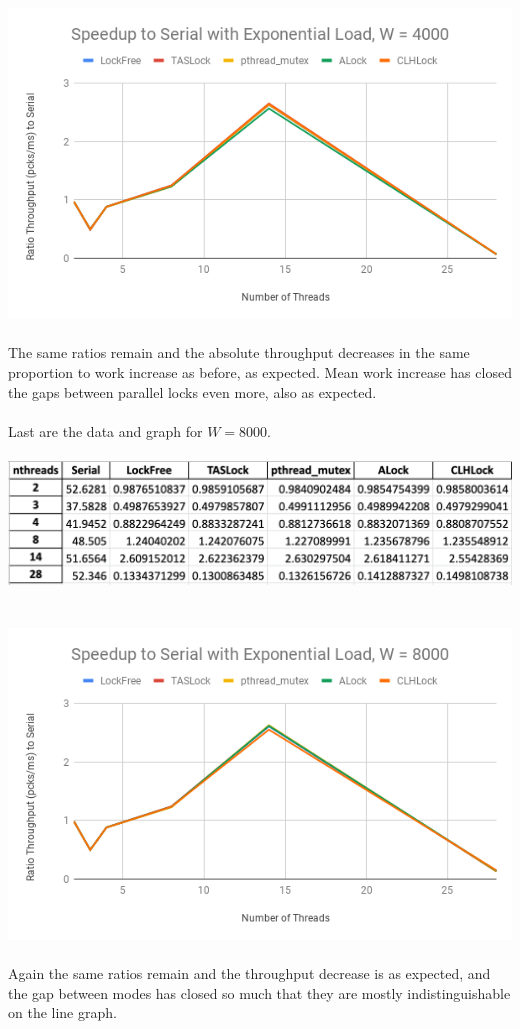 \documentclass{article}
\begin{document}
\begin{adjustwidth}{-2cm}{-2cm}
\null\\
\includegraphics[width=\linewidth]{b_exp4000Graph.png}\\ \null\\
The same ratios remain and the absolute throughput decreases in the same proportion to work increase as before, as expected. Mean work increase has closed the gaps between parallel locks even more, also as expected.\\
\null\\Last are the data and graph for $W=8000$.\\
\null\\
\includegraphics[width=\linewidth]{b_exp8000Data.png}\\ \null\\
\null\\
\includegraphics[width=\linewidth]{b_exp8000Graph.png}\\ \null\\
Again the same ratios remain and the throughput decrease is as expected, and the gap between modes has closed so much that they are mostly indistinguishable on the line graph.


\end{adjustwidth}
\end{document}
